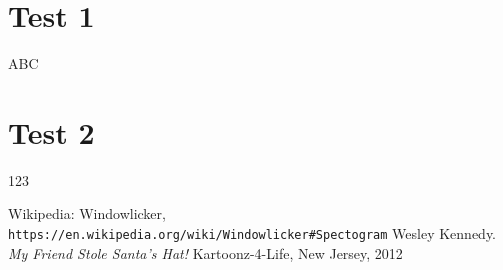 \documentclass[]{article}
\begin{document}
\part*{Test 1}

ABC

\part*{Test 2}

123

\begin{thebibliography}{1}
		Wikipedia: Windowlicker,
		\\\texttt{https://en.wikipedia.org/wiki/Windowlicker\#Spectogram}
		Wesley Kennedy.
		\textit{My Friend Stole Santa's Hat!}\newline
		Kartoonz-4-Life, New Jersey, 2012
\end{thebibliography}
\end{document}
